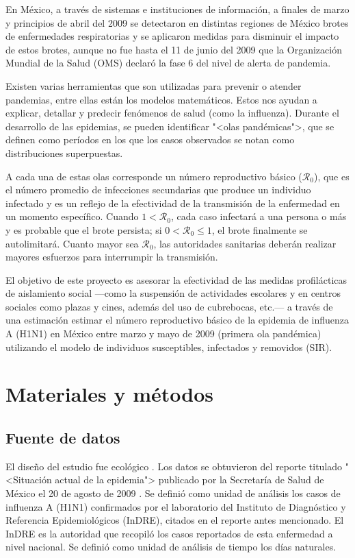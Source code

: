 \documentclass[12pt]{article}
\begin{document}
	En México, a través de sistemas e instituciones de información, a finales de marzo y principios de abril del 2009 se detectaron en distintas regiones de México brotes de enfermedades respiratorias y se aplicaron medidas para disminuir el impacto de estos brotes, aunque no fue hasta el 11 de junio del 2009 que la Organización Mundial de la Salud (OMS) declaró la fase 6 del nivel de alerta de pandemia.
	
	Existen varias herramientas que son utilizadas para prevenir o atender pandemias, entre ellas están los modelos matemáticos. Estos nos ayudan a explicar, detallar y predecir fenómenos de salud (como la influenza). Durante el desarrollo
	de las epidemias, se pueden identificar "<olas pandémicas">, que se definen como períodos en los que los casos observados se notan como distribuciones superpuestas.
	
	A cada una de estas olas corresponde un número reproductivo básico ($\mathcal{R}_0$), que es el número promedio de infecciones secundarias que produce un individuo infectado y es un reflejo de la efectividad de la transmisión de la enfermedad en un momento específico. Cuando $ 1 < \mathcal{R}_0 $, cada caso infectará a una persona o más y es
	probable que el brote persista; si $ 0 < \mathcal{R}_0 \leq 1 $, el brote finalmente se autolimitará. Cuanto mayor sea $ \mathcal{R}_0 $, las autoridades sanitarias deberán realizar mayores esfuerzos para interrumpir la transmisión.
	
	El objetivo de este proyecto es asesorar la efectividad de las medidas profilácticas de aislamiento social ---como la suspensión de actividades escolares y en centros sociales como plazas y cines, además del uso de cubrebocas, etc.---	a través de una estimación estimar el número reproductivo básico de la epidemia de influenza A (H1N1) en México entre marzo y mayo de 2009 (primera ola pandémica) utilizando el modelo de individuos susceptibles, infectados y removidos (SIR).
	
	\section{Materiales y métodos}
	\subsection*{Fuente de datos}
	
	El diseño del estudio fue ecológico \cite{VillaRomero2012}. Los datos se obtuvieron del reporte titulado "<Situación actual de la epidemia"> publicado por la Secretaría de Salud de México el 20 de agosto de 2009 \cite{Salud2009}. Se definió como unidad de análisis los casos de influenza A (H1N1) confirmados por el laboratorio del Instituto de Diagnóstico y Referencia Epidemiológicos (InDRE), citados en el reporte antes mencionado. El InDRE es la autoridad que recopiló los casos reportados de esta enfermedad a nivel nacional. Se definió como unidad de análisis de tiempo los días naturales.
	
\end{document}
